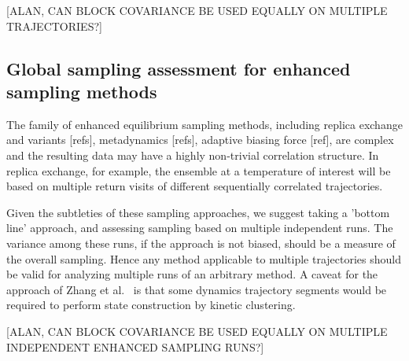 [ALAN, CAN BLOCK COVARIANCE BE USED EQUALLY ON MULTIPLE TRAJECTORIES?]

\subsection{Global sampling assessment for enhanced sampling methods}
The family of enhanced equilibrium sampling methods, including replica exchange and variants [refs], metadynamics [refs], adaptive biasing force [ref], are complex and the resulting data may have a highly non-trivial correlation structure.
In replica exchange, for example, the ensemble at a temperature of interest will be based on multiple return visits of different sequentially correlated trajectories.

Given the subtleties of these sampling approaches, we suggest taking a 'bottom line' approach, and assessing sampling based on multiple independent runs.
The variance among these runs, if the approach is not biased, should be a measure of the overall sampling.
Hence any method applicable to multiple trajectories should be valid for analyzing multiple runs of an arbitrary method.
A caveat for the approach of Zhang et al.\ \cite{Zhang2010} is that some dynamics trajectory segments would be required to perform state construction by kinetic clustering.

[ALAN, CAN BLOCK COVARIANCE BE USED EQUALLY ON MULTIPLE INDEPENDENT ENHANCED SAMPLING RUNS?]

